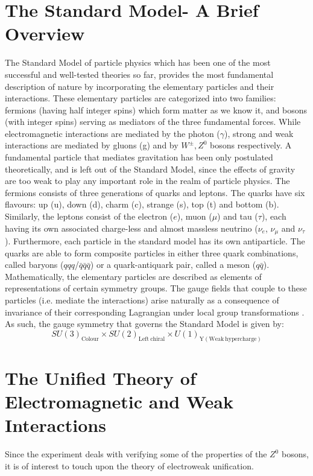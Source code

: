 \section{The Standard Model- A Brief Overview}
The Standard Model of particle physics which has been one of the most successful and well-tested theories so far, provides the most fundamental description of nature by incorporating the elementary particles and their interactions. These elementary particles are categorized into two families: fermions (having half integer spins) which form matter as we know it, and bosons (with integer spins) serving as mediators of the three fundamental forces. While electromagnetic interactions are mediated by the photon ($\gamma$), strong and weak interactions are mediated by gluons (g) and by $W^{\pm}, Z^{0}$ bosons respectively. A fundamental particle that mediates gravitation has been only postulated theoretically, and is left out of the Standard Model, since the effects of gravity are too weak to play any important role in the realm of particle physics. The fermions consists of three generations of quarks and leptons. The quarks have six flavours: up (u), down (d), charm (c), strange (s), top (t) and bottom (b). Similarly, the leptons consist of the electron ($e$), muon ($\mu$) and tau ($\tau$), each having its own associated charge-less and almost massless neutrino ($\nu_{e}$, $\nu_{\mu}$ and $\nu_{\tau}$). Furthermore, each particle in the standard model has its own antiparticle. The quarks are able to form composite particles in either three quark combinations, called baryons ($qqq$/$\bar{q}\bar{q}\bar{q}$) or a quark-antiquark pair, called a meson ($q\bar{q}$). Mathematically, the elementary particles are described as elements of representations of certain symmetry groups. The gauge fields that couple to these particles (i.e. mediate the interactions) arise naturally as a consequence of invariance of their corresponding Lagrangian under local group transformations \cite{thomson_2013}. As such, the gauge symmetry that governs the Standard Model is given by: $$SU(3)_{\mathrm{Colour}}\times SU(2)_{\mathrm{Left\ chiral}}\times U(1)_{\mathrm{Y}(\mathrm{Weak \ hypercharge})}$$

\section{The Unified Theory of Electromagnetic and Weak Interactions}
Since the experiment deals with verifying some of the properties of the $Z^{0}$ bosons, it is of interest to touch upon the theory of electroweak unification.

